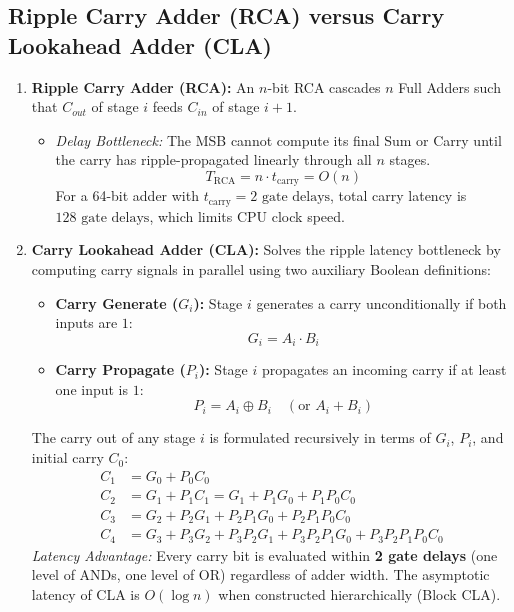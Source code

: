 \subsection{Ripple Carry Adder (RCA) versus Carry Lookahead Adder (CLA)}
\begin{enumerate}[label=\bfseries\arabic*.]
    \item \textbf{Ripple Carry Adder (RCA):} An $n$-bit RCA cascades $n$ Full Adders such that $C_{out}$ of stage $i$ feeds $C_{in}$ of stage $i+1$.
    \begin{itemize}
        \item \textit{Delay Bottleneck:} The MSB cannot compute its final Sum or Carry until the carry has ripple-propagated linearly through all $n$ stages.
        \begin{equation}
        \label{eq:rca_delay}
        T_{\text{RCA}} = n \cdot t_{\text{carry}} = O(n)
        \end{equation}
        For a 64-bit adder with $t_{\text{carry}} = 2\text{ gate delays}$, total carry latency is $128\text{ gate delays}$, which limits CPU clock speed.
    \end{itemize}
    \item \textbf{Carry Lookahead Adder (CLA):} Solves the ripple latency bottleneck by computing carry signals in parallel using two auxiliary Boolean definitions:
    \begin{itemize}
        \item \textbf{Carry Generate ($G_i$):} Stage $i$ generates a carry unconditionally if both inputs are $1$:
        \[ G_i = A_i \cdot B_i \]
        \item \textbf{Carry Propagate ($P_i$):} Stage $i$ propagates an incoming carry if at least one input is $1$:
        \[ P_i = A_i \oplus B_i \quad (\text{or } A_i + B_i) \]
    \end{itemize}
    The carry out of any stage $i$ is formulated recursively in terms of $G_i$, $P_i$, and initial carry $C_0$:
    \begin{align*}
    C_1 &= G_0 + P_0 C_0 \\
    C_2 &= G_1 + P_1 C_1 = G_1 + P_1 G_0 + P_1 P_0 C_0 \\
    C_3 &= G_2 + P_2 G_1 + P_2 P_1 G_0 + P_2 P_1 P_0 C_0 \\
    C_4 &= G_3 + P_3 G_2 + P_3 P_2 G_1 + P_3 P_2 P_1 G_0 + P_3 P_2 P_1 P_0 C_0
    \end{align*}
    \textit{Latency Advantage:} Every carry bit is evaluated within \textbf{2 gate delays} (one level of ANDs, one level of OR) regardless of adder width. The asymptotic latency of CLA is $O(\log n)$ when constructed hierarchically (Block CLA).
\end{enumerate}

